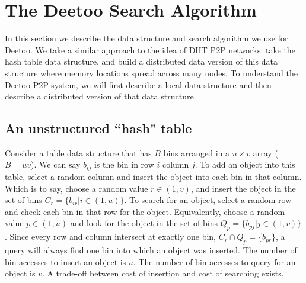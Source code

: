 \documentclass[conference]{IEEEtran}
\begin{document}
\section{The Deetoo Search Algorithm}\label{sec:model}
In this section we describe the data structure and search algorithm
we use for Deetoo.  We take a similar approach to the idea of DHT P2P networks: take the hash table
data structure, and build a distributed data version of this data structure
where memory locations spread across many nodes.  
To understand the Deetoo P2P system, we will first describe a local
data structure and then describe a distributed version of that data structure.

\subsection{An unstructured ``hash" table}
\label{sec:localtab}
Consider a table data structure that has $B$ bins arranged in a $u\times v$
array ($B=uv$).  We can say $b_{ij}$ is the bin in row $i$ column $j$.  To add an
object into this table, select a random column and insert the object into each
bin in that column.  Which is to say, choose a random value $r\in (1,v)$,
and insert the object in the set of bins $C_r = \{b_{ir} | i \in (1,u)\}$.
To search for an object, select a random row and check each bin in that
row for the
object.  Equivalently, choose a random value $p \in (1,u)$ and look
for the object in the set of bins $Q_p = \{b_{pj} | j \in (1,v)\}$.  Since
every row and column intersect at exactly one bin, $C_r \cap Q_p = \{b_{pr}\}$,
a query will always find
one bin into which an object was inserted.  The number of bin accesses to
insert an object is $u$.  The number of bin accesses to query for an object is
$v$.  A trade-off between cost of insertion and cost of searching exists.
\end{document}
